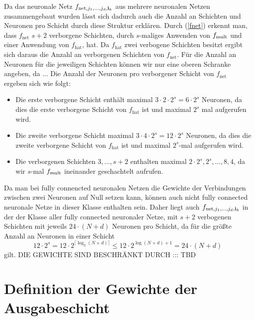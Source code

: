 Da das neuronale Netz $f_{\mathrm{net},j_1,\dots,j_d,\mathbf{i}_k}$ aus mehrere neuronalen Netzen zusammengebaut wurden lässt sich dadurch auch die Anzahl an Schichten und Neuronen pro Schicht durch diese Struktur erklären. Durch (\ref{fnet}) erkennt man, dass $f_{\mathrm{net}}$ $s + 2$ verborgene Schichten, durch $s$-maliges Anwenden von $f_{\mathrm{mult}}$ und einer Anwendung von $f_{\mathrm{hat}}$, hat. Da $f_{\mathrm{hat}}$ zwei verbogene Schichten besitzt ergibt sich daraus die Anzahl an verborgenen Schichten von $f_{\mathrm{net}}$. Für die Anzahl an Neuronen für die jeweiligen Schichten können wir nur eine oberen Schranke angeben, da ... 
Die Anzahl der Neuronen pro verborgener Schicht von $f_{\mathrm{net}}$ ergeben sich wie folgt:
\begin{itemize}
\item Die erste verborgene Schicht enthält maximal $3 \cdot 2 \cdot 2^s = 6 \cdot 2^s$ Neuronen, da dies die erste verborgene Schicht von $f_{\mathrm{hat}}$ ist und maximal $2^s$ mal aufgerufen wird. 
\item Die zweite verborgene Schicht maximal $3 \cdot 4 \cdot 2^s = 12\cdot 2^s$ Neuronen, da dies die zweite verborgene Schicht von $f_{\mathrm{hat}}$ ist und maximal $2^s$-mal aufgerufen wird.
\item Die verborgenen Schichten $3,\dots,s + 2$ enthalten maximal   $2 \cdot 2^s, 2^s, \dots, 8, 4$, da wir $s$-mal $f_{\mathrm{mult}}$ ineinander geschachtelt aufrufen. 
\end{itemize}  
Da man bei fully connencted neuronalen Netzen die Gewichte der Verbindungen zwischen zwei Neuronen auf Null setzen kann, können auch nicht fully connected neuronale Netze in dieser Klasse enthalten sein. Daher liegt auch $f_{\mathrm{net},j_1,\dots,j_d,\mathbf{i}_k}$ in der der Klasse aller fully connected neuronaler Netze, mit $s + 2$ verbogenen Schichten mit jeweils $24 \cdot (N + d)$ Neuronen pro Schicht, da für die größte Anzahl an Neuronen in einer Schicht $$12 \cdot 2^s = 12 \cdot 2^{\lceil\log_2(N + d)\rceil} \leq 12 \cdot 2^{\log(N + d) + 1} = 24 \cdot (N + d)$$ gilt. DIE GEWICHTE SIND BESCHRÄNKT DURCH ::: TBD

\section{Definition der Gewichte der Ausgabeschicht}

